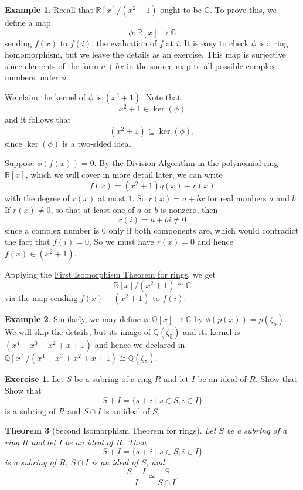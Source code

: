 \documentclass[12pt]{report}
\newtheorem{theorem}{Theorem}[chapter]
\numberwithin{equation}{section}
\numberwithin{theorem}{chapter}
\theoremstyle{definition}
\newtheorem{example}[theorem]{Example}
\newtheorem{exercise}{Exercise}
\newtheorem*{basic properties}{Basic Properties}
\newtheorem*{Important Remark}{Important Remark}
\newcommand{\C}{\mathbb{C}}
\renewcommand{\ker}{\operatorname{ker}}
\begin{document}
\begin{example}\label{qt by x^2+1}
Recall that $\mathbb{R}[x]/(x^2+1)$ ought to be $\C$. 
To prove this, we define a map
$$\phi\!: \mathbb{R}[x] \longrightarrow \C$$
sending $f(x)$ to $f(i)$, the evaluation of $f$ at $i$. It is easy to check $\phi$ is a ring homomorphism, but we leave the details as an exercise. 
This map is surjective since elements of the form $a + bx$ in the source map to all possible complex numbers under $\phi$.

We claim the kernel of $\phi$ is $(x^2 +1)$. Note that 
$$x^2 + 1 \in \ker(\phi)$$ 
and it follows that 
$$(x^2 + 1) \subseteq \ker(\phi),$$ 
since $\ker(\phi)$ is a two-sided ideal.

Suppose $\phi(f(x)) = 0$. By the Division Algorithm in the polynomial ring $\mathbb{R}[x]$, which we will cover in more detail later, we can write
$$f(x) = (x^2 + 1)q(x) + r(x)$$ 
with the degree of $r(x)$ at most $1$. 
So $r(x) = a + bx$ for real numbers $a$ and $b$. If $r(x) \neq 0$, so that at least one of $a$ or $b$ is nonzero, then
$$r(i) = a + bi \neq 0$$ 
since a complex number is $0$ only if both components are, which would contradict the fact that $f(i) = 0$. So we must have $r(x) = 0$ and hence $f(x) \in (x^2 +1)$.

Applying the \hyperref[First Isomorphism Theorem for rings]{First Isomorphism Theorem for rings}, we get
$$\mathbb{R}[x]/(x^2+1) \cong \C$$
via the map sending $f(x) + (x^2 + 1)$ to $f(i)$.
\end{example}

\begin{example} 
Similarly, we may define $\phi\!: \mathbb{Q}[x] \to \C$ by $\phi(p(x)) = p(\zeta_5)$. We will skip the details, but its image of $\mathbb{Q}(\zeta_5)$ and its kernel is $(x^4+x^3+x^2+x+1)$ and hence we declared in  $\mathbb{Q}[x]/(x^4+x^3+x^2+x+1) \cong \mathbb{Q}(\zeta_5)$.
\end{example}



\begin{exercise}\label{exercise 2nd iso rings}
	 Let $S$ be a subring of a ring $R$ and let $I$ be an ideal of $R$. Show that
	 Show that  
	 $$S + I = \{s + i \mid s \in S, i \in I\}$$ 
is a subring of $R$ and $S \cap I$ is an ideal of $S$.
\end{exercise}


\begin{theorem}[Second Isomorphism Theorem for rings]\label{Second Isomorphism Theorem for rings}
 Let $S$ be a subring  of a ring $R$ and let $I$ be an ideal of $R$. Then 
 $$S + I = \{s + i \mid s \in S, i \in I\}$$ 
 is a subring of $R$, $S \cap I$ is an ideal of $S$, and
 $$\frac{S+I}{I}\cong \frac{S}{S\cap I}.$$
\end{theorem}
\end{document}
